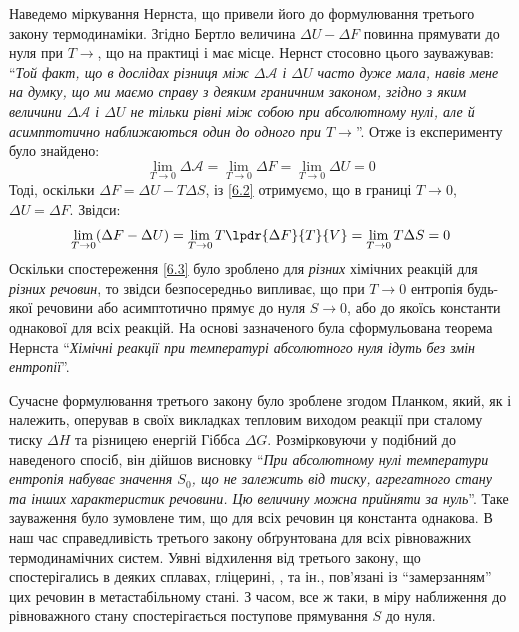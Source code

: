 Наведемо міркування Нернста, що привели його до формулювання третього закону термодинаміки. Згідно Бертло величина $\Delta U -\Delta F$ повинна прямувати до нуля при $T\to$, що на практиці і має місце. Нернст стосовно цього зауважував: \enquote{\emph{Той факт, що в дослідах різниця між $\Delta\mathcal{A}$  і $\Delta U$ часто дуже мала, навів мене на думку, що ми маємо справу з деяким граничним законом, згідно з яким величини $\Delta\mathcal{A}$ і $\Delta U$ не тільки рівні між собою при абсолютному нулі, але й асимптотично наближаються один до одного при $T\to$}}. Отже із експерименту було знайдено:
\begin{equation}\label{6.2}
	\lim\limits_{T\rightarrow0}\Delta\mathcal{A} = \lim\limits_{T\rightarrow0}\Delta F = \lim\limits_{T\rightarrow0}\Delta U = 0
\end{equation}
Тоді, оскільки $\Delta F = \Delta U - T\Delta S$, із \eqref{6.2} отримуємо, що в границі $T\rightarrow0$, $\Delta U = \Delta F$. Звідси:
\begin{equation}\label{6.3}
	\lim\limits_{T\rightarrow0}(\Delta F - \Delta U) = \lim\limits_{T\rightarrow0}T\lpdr{\Delta F}{T}{V} = \lim\limits_{T\rightarrow0}T\Delta S =0
\end{equation}
Оскільки спостереження \eqref{6.3} було зроблено для \emph{різних} хімічних реакцій для \emph{різних речовин}, то звідси безпосередньо випливає, що при $T\rightarrow0$ ентропія будь-якої речовини або асимптотично прямує до нуля $S\rightarrow0$, або до якоїсь константи однакової для всіх реакцій. На основі зазначеного була сформульована теорема Нернста \enquote{\emph{Хімічні реакції при температурі абсолютного нуля ідуть без змін ентропії}}.

Сучасне формулювання третього закону було зроблене згодом Планком, який, як і належить, оперував в своїх викладках тепловим виходом реакції при сталому тиску $\Delta H$ та різницею енергій Гіббса $\Delta G$. Розмірковуючи у подібний до наведеного спосіб, він дійшов висновку \enquote{\emph{При абсолютному нулі температури ентропія набуває значення $S_0$, що не залежить від тиску, агрегатного стану та інших характеристик речовини. Цю величину можна прийняти за нуль}}. Таке зауваження було зумовлене тим, що для всіх речовин ця константа однакова. В наш час справедливість третього закону обґрунтована для всіх рівноважних термодинамічних систем. Уявні відхилення від третього закону, що спостерігались в деяких сплавах, гліцерині, ,  та ін., пов'язані із \enquote{замерзанням} цих речовин в метастабільному стані. З часом, все ж таки, в міру наближення до рівноважного стану спостерігається поступове прямування $S$ до нуля.


